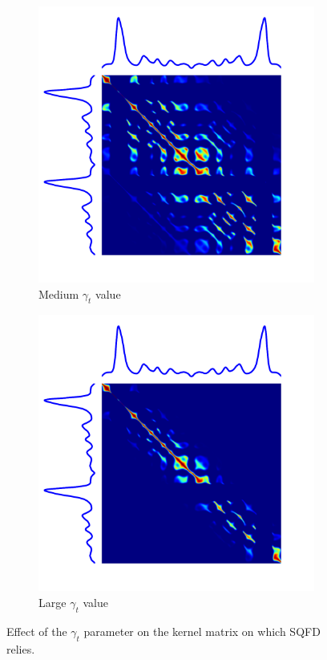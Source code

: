 \begin{figure}[t]
\begin{subfigure}[b]{0.3\textwidth}
          \includegraphics[width=\textwidth]{fig/gram_gammat10}
          \caption{Medium $\gamma_t$ value}
      \end{subfigure}
      \hfill
      \begin{subfigure}[b]{0.3\textwidth}
           \centering
           \includegraphics[width=\textwidth]{fig/gram_gammat100}
           \caption{Large $\gamma_t$ value}
       \end{subfigure}
    \caption{Effect of the $\gamma_t$ parameter on the kernel matrix on which
    SQFD relies.}
    \label{fig:gamma_t}
\end{figure}

